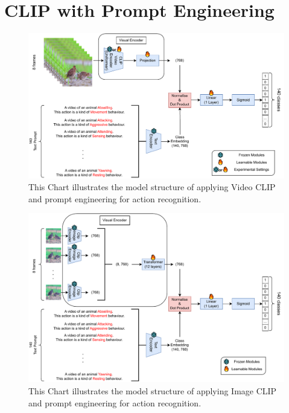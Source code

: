 \section{CLIP with Prompt Engineering}
\begin{figure}[ht]
    \centering
    \includegraphics[width=1.0\textwidth]{assets/imgs/3_1_ModelStructureVC}
    \caption[CLIP Action Recognition Model Structure 1]{This Chart illustrates the model structure of applying Video CLIP and prompt engineering for action recognition.}
    \label{fig:modelstructic1}
\end{figure}

\begin{figure}[ht]
    \centering
    \includegraphics[width=1.0\textwidth]{assets/imgs/3_2_ModelStructureIC}
    \caption[CLIP Action Recognition Model Structure 2]{This Chart illustrates the model structure of applying Image CLIP and prompt engineering for action recognition.}
    \label{fig:modelstructic2}
\end{figure}

